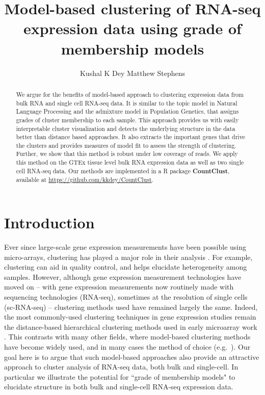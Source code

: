 \title{\Large{\textbf{Model-based clustering of RNA-seq expression data using grade of membership models}}}
\author{ Kushal K Dey  \qquad Matthew Stephens}

\maketitle

\begin{abstract}
We argue for the benefits of model-based approach to clustering expression data from bulk RNA and single cell RNA-seq data. It is similar to the topic model in Natural Language Processing and the admixture model in Population Genetics, that assigns grades of cluster membership to each sample. This approach provides us with easily interpretable cluster visualization  and  detects the underlying structure in the data better than distance based approaches. It also extracts the important genes that drive the clusters and provides measures of model fit to assess the strength of clustering. Further, we show that this method is robust under low coverage of reads. We apply this method on the GTEx tissue level bulk RNA expression data as well as two single cell RNA-seq data. Our methods are implemented in a R package \textbf{CountClust}, available at \url{https://github.com/kkdey/CountClust}.
\end{abstract}

\section{Introduction}

Ever since large-scale gene expression measurements have been possible using micro-arrays, clustering has played a major role in their analysis \cite{eisen:pnas1998}.
For example, clustering can aid in quality control, and helps elucidate heterogeneity among samples. However, although gene expression 
measurement technologies have moved on -- with gene expression measurements now routinely made with sequencing technologies (RNA-seq), sometimes at the resolution of single cells (sc-RNA-seq) -- clustering methods used have remained largely the same. Indeed, the most commonly-used clustering techniques in gene expression studies
remain the distance-based hierarchical clustering 
methods used in early microarray work \cite{eisen}. This contrasts with many other fields, where model-based clustering methods
have become widely used, and in many cases the method of choice (e.g.~\cite{Pritchard2000}). Our goal here
is to argue that such model-based approaches also provide an attractive approach to cluster analysis of RNA-seq data, both bulk and single-cell.
In particular we illustrate the potential for ``grade of membership models" \cite{erosheva} to elucidate structure in both bulk and single-cell RNA-seq expression data. 

